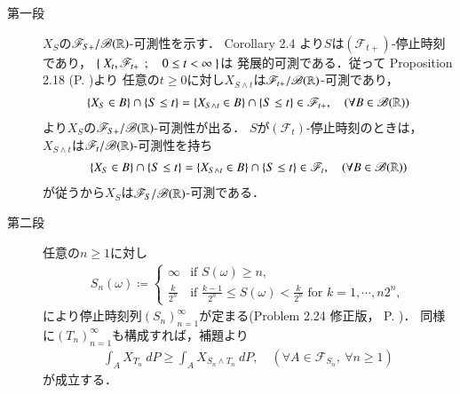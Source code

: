 	\begin{prf}\mbox{}
		\begin{description}
			\item[第一段]
				$X_S$の$\mathscr{F}_{S+}/\mathscr{B}(\mathbb{R})$-可測性を示す．
				Corollary 2.4 より$S$は$(\mathscr{F}_{t+})$-停止時刻であり，
				$\left\{\ X_t,\mathscr{F}_{t+}\ \, ; \quad 0 \leq t < \infty\ \right\}$は
				発展的可測である．従って
				Proposition 2.18 (P. \pageref{chapter_1_Problem_2_18})より
				任意の$t \geq 0$に対し$X_{S \wedge t}$は$\mathscr{F}_{t+}/\mathscr{B}(\mathbb{R})$-可測であり，
				\begin{align}
					\{X_S \in B\} \cap \{S \leq t\}
					= \{X_{S \wedge t} \in B\} \cap \{S \leq t\}
					\in \mathscr{F}_{t+},
					\quad (\forall B \in \mathscr{B}(\mathbb{R}))
				\end{align}
				より$X_S$の$\mathscr{F}_{S+}/\mathscr{B}(\mathbb{R})$-可測性が出る．
				$S$が$(\mathscr{F}_t)$-停止時刻のときは，
				$X_{S \wedge t}$は$\mathscr{F}_t/\mathscr{B}(\mathbb{R})$-可測性を持ち
				\begin{align}
					\{X_S \in B\} \cap \{S \leq t\}
					= \{X_{S \wedge t} \in B\} \cap \{S \leq t\}
					\in \mathscr{F}_t,
					\quad (\forall B \in \mathscr{B}(\mathbb{R}))
				\end{align}
				が従うから$X_S$は$\mathscr{F}_S/\mathscr{B}(\mathbb{R})$-可測である．
			
			\item[第二段]
				任意の$n \geq 1$に対し
				\begin{align}
					S_n(\omega) \coloneqq
					\begin{cases}
						\infty & \mbox{if $S(\omega) \geq n$}, \\
						\displaystyle\frac{k}{2^n} & \mbox{if $\displaystyle\frac{k-1}{2^n} \leq S(\omega) < \frac{k}{2^n}$ for $k=1,\cdots,n2^n$},
					\end{cases}
				\end{align}
				により停止時刻列$(S_n)_{n=1}^\infty$が定まる(Problem 2.24 修正版， P. \pageref{chapter_1_Problem_2_24})．
				同様に$(T_n)_{n=1}^\infty$も構成すれば，補題より
				\begin{align}
					\int_A X_{T_n}\ dP \geq \int_A X_{S_n \wedge T_n}\ dP,
					\quad (\forall A \in \mathscr{F}_{S_n},\ \forall n \geq 1)
				\end{align}
				が成立する．
		\end{description}
	\end{prf}
	